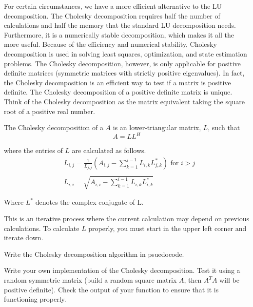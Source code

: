 

For certain circumstances, we have a more efficient alternative to the LU decomposition.  The Cholesky decomposition requires half the number of calculations and half the memory that the standard LU decomposition needs.  Furthermore, it is a numerically stable decomposition, which makes it all the more useful.  Because of the efficiency and numerical stability, Cholesky decomposition is used in solving least squares, optimization, and state estimation problems.  The Cholesky decomposition, however, is only applicable for positive definite matrices (symmetric matrices with strictly positive eigenvalues).  In fact, the Cholesky decomposition is an efficient way to test if a matrix is positive definite.  The Cholesky decomposition of a positive definite matrix is unique.  Think of the Cholesky decomposition as the matrix equivalent taking the square root of a positive real number.

The Cholesky decomposition of a $A$ is an lower-triangular matrix, $L$, such that
\begin{equation*}
 A = LL^H
\end{equation*}

where the entries of $L$ are calculated as follows.
\begin{align*}
&L_{i,j} = \frac{1}{L_{j,j}}\left(A_{i,j} -\sum_{k=1}^{j-1}{L_{i,k}L_{j,k}^*}\right) \mbox{ for $i>j$} \\ \\
&L_{i,i} = \sqrt{A_{i,i} - \sum_{k=1}^{i-1}{L_{i,k}L_{i,k}^*}}
\end{align*}

Where $L^*$ denotes the complex conjugate of L.

This is an iterative process where the current calculation may depend on previous calculations.  To calculate $L$ properly, you must start in the upper left corner and iterate down.

\begin{problem}
Write the Cholesky decomposition algorithm in psuedocode.
\end{problem}

\begin{problem}
Write your own implementation of the Cholesky decomposition. Test it using a random symmetric matrix (build a random square matrix $A$, then $A^TA$ will be positive definite). Check the output of your function to ensure that it is functioning properly.
\end{problem}


